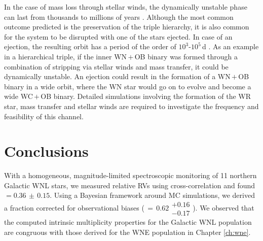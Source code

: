 In the case of mass loss through stellar winds, the dynamically unstable phase can last from thousands to millions of years \citep{toonen_stellar_2022}. Although the most common outcome predicted is the preservation of the triple hierarchy, it is also common for the system to be disrupted with one of the stars ejected. In case of an ejection, the resulting orbit has a period of the order of $10^3$-$10^5\,$d \citep{toonen_stellar_2022}. As an example in a hierarchical triple, if the inner WN\,$+$\,OB binary was formed through a combination of stripping via stellar winds and mass transfer, it could be dynamically unstable. An ejection could result in the formation of a WN\,$+$\,OB binary in a wide orbit, where the WN star would go on to evolve and become a wide WC\,$+$\,OB binary. Detailed simulations involving the formation of the WR star, mass transfer and stellar winds are required to investigate the frequency and feasibility of this channel.

\section{Conclusions} \label{sect:conclusions_WNL}
With a homogeneous, magnitude-limited spectroscopic monitoring of 11 northern Galactic WNL stars, we measured relative RVs using cross-correlation and found \fobsWNL{}\,$=0.36\,\pm\,0.15$. Using a Bayesian framework around MC simulations, we derived a fraction corrected for observational biases (\fintWNL{}$\,=\,0.62\substack{+0.16 \\ -0.17}$). We observed that the computed intrinsic multiplicity properties for the Galactic WNL population are congruous with those derived for the WNE population in Chapter \ref{ch:wne}.


